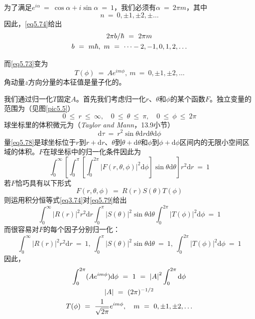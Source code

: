 \documentclass[12pt,a4paper,openany]{ctexbook}
\newcommand{\abs}[1]{\left| #1 \right|}
\newcommand{\dd}[1]{\mathrm{d} #1}
\begin{document}
\begin{flushleft}
为了满足$e^{i\alpha}\ =\ \cos\alpha+i\sin\alpha\ =\ 1$，我们必须有$\alpha\ =\ 2\pi m$，其中
\begin{equation*}
    n\ =\ 0,\pm1,\pm2,\pm\dots
\end{equation*}
因此，\eqref{eq5.74}给出
\begin{gather}
    2\pi b/\hbar\ =\ 2\pi m \notag \\
    b\ =\ m\hbar,\ m\ =\ \dots-2,-1,0,1,2,\dots \label{eq5.75}
\end{gather}

而\eqref{eq5.73}变为
\begin{equation}
    T(\phi)\ =\ Ae^{im\phi},\ m\ =\ 0,\pm1,\pm2,\dots \label{eq5.76}
\end{equation}
角动量$z$方向分量的本征值是量子化的。

我们通过归一化$T$固定$A$。首先我们考虑归一化$r$、$\theta$和$\phi$的某个函数$F$。独立变量的范围为（见图\ref{pic5.5}）
\begin{equation}
    \boxed{0\ \leq\ r\ \leq\ \infty,\quad0\ \leq\ \theta\ \leq\ \pi,\quad0\ \leq\ \phi\ \leq\ 2\pi} \label{eq5.77}
\end{equation}
球坐标里的体积微元为（\textit{Taylor and Mann}，13.9小节）
\begin{equation}
    \boxed{\dd\tau\ =\ r^2\sin\theta\dd r\dd\theta\dd\phi} \label{eq5.78}
\end{equation}
量\eqref{eq5.78}是球坐标位于$r$到$r+\dd r$、$\theta$到$\theta+\dd\theta$和$\phi$到$\phi+\dd\phi$区间内的无限小空间区域的体积。$F$在球坐标中的归一化条件因此为
\begin{equation}
    \int_0^{\infty}\left[\int_0^{\pi}\left[\int_0^{2\pi}\abs{F(r,\theta,\phi)}^2\dd\phi\right]\sin\theta\dd\theta\right]r^2\dd r\ =\ 1 \label{eq5.79}
\end{equation}
若$F$恰巧具有以下形式
\begin{equation*}
    F(r,\theta,\phi)\ =\ R(r)S(\theta)T(\phi)
\end{equation*}
则运用积分恒等式\eqref{eq3.74}对\eqref{eq5.79}给出
\begin{equation*}
    \int_0^{\infty}\abs{R(r)}^2r^2\dd r\int_0^{\pi}\abs{S(\theta)}^2\sin\theta\dd\theta\int_0^{2\pi}\abs{T(\phi)}^2\dd\phi\ =\ 1
\end{equation*}
而很容易对$F$的每个因子分别归一化：
\begin{equation}
    \int_0^{\infty}\abs{R(r)}^2r^2\dd r\ =\ 1,\ \int_0^{\pi}\abs{S(\theta)}^2\sin\theta\dd\theta\ =\ 1,\ \int_0^{2\pi}\abs{T(\phi)}^2\dd\phi\ =\ 1 \label{eq5.80}
\end{equation}
因此，
\begin{gather}
    \int_0^{2\pi}(Ae^{im\phi})\dd\phi\ =\ 1\ =\ \abs{A}^2\int_0^{2\pi}\dd\phi \notag \\
    \abs{A}\ =\ (2\pi)^{-1/2} \notag \\
    T(\phi)\ =\ \frac{1}{\sqrt{2\pi}}e^{im\phi},\quad m\ =\ 0,\pm1,\pm2,\dots \label{eq5.81}
\end{gather}


\end{flushleft}
\end{document}
